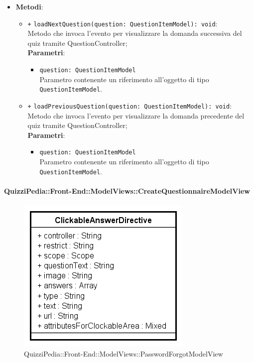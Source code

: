 \begin{itemize}
\begin{itemize}
		\end{itemize}
		\item \textbf{Metodi}: 
		\begin{itemize}
			\item \texttt{+} \texttt{loadNextQuestion(question: QuestionItemModel): void}: \\ Metodo che invoca l'evento per visualizzare la domanda successiva del quiz tramite QuestionController; \\
			\textbf{Parametri}:
			\begin{itemize}
				\item \texttt{question: QuestionItemModel} \\
				Parametro contenente un riferimento all'oggetto di tipo \texttt{QuestionItemModel}.
			\end{itemize}
			\item \texttt{+} \texttt{loadPreviousQuestion(question: QuestionItemModel): void}: \\ Metodo che invoca l'evento per visualizzare la domanda precedente del quiz tramite QuestionController; \\
			\textbf{Parametri}:
			\begin{itemize}
				\item \texttt{question: QuestionItemModel} \\
				Parametro contenente un riferimento all'oggetto di tipo \texttt{QuestionItemModel}.
			\end{itemize}
		\end{itemize}
	\end{itemize}
	
	\paragraph{QuizziPedia::Front-End::ModelViews::CreateQuestionnaireModelView}
	
	\label{QuizziPedia::Front-End::ModelViews::CreateQuestionnaireModelView}
	
	\begin{figure}[ht]
		\centering
		\includegraphics[scale=0.5,keepaspectratio]{UML/Classi/Front-End/QuizziPedia_Front-end_Templates_ClickableAnswerTemplate.png}
		\caption{QuizziPedia::Front-End::ModelViews::PasswordForgotModelView}
	\end{figure} \FloatBarrier
	
